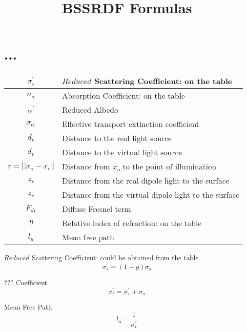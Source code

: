\documentclass{article}
\title{BSSRDF Formulas}
\begin{document}
\maketitle

\section{...}

\begin{table}[h]
\begin{center}
\begin{tabular}{|c l|}
\hline
${\sigma} _s ^{\prime}$ & $Reduced$ Scattering Coefficient: on the table \\
\hline
${\sigma} _a$ & Absorption Coefficient: on the table \\
\hline
$\alpha ^{\prime}$ & Reduced Albedo \\
\hline
${\sigma}_{tr}$ & Effective transport extinction coefficient \\
\hline
$d_r$ & Distance to the real light source \\
\hline
$d_v$ & Distance to the virtual light source \\
\hline
$r = ||x_o - x_i||$ & Distance from $x_o$ to the point of illumination \\
\hline
$z_r$ & Distance from the real dipole light to the surface \\
\hline
$z_v$ & Distance from the virtual dipole light to the surface \\
\hline
$F_{dr}$ & Diffuse Fresnel term \\
\hline
$\eta$ & Relative index of refraction: on the table \\
\hline
$l _u$ & Mean free path \\
\hline
\end{tabular}
\end{center}
\end{table}


$Reduced$ Scattering Coefficient: could be obtained from the table
\begin{equation}
{\sigma} _s ^{\prime} = (1 - g) \sigma _s
\end{equation}

??? Coefficient
\begin{equation}
{\sigma} _t ^{\prime} = {\sigma} _s ^{\prime} + {\sigma} _a
\end{equation}

Mean Free Path
\begin{equation}
l _u = \frac{1}{{\sigma} _t ^{\prime}}
\end{equation}
\end{document}
